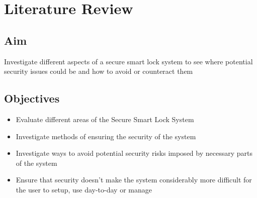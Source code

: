 \chapter{Literature Review}
\label{chap:literature_review}

\section{Aim}
Investigate different aspects of a secure smart lock system to see where potential security issues could be and how to avoid or counteract them
\section{Objectives}
\begin{itemize}
	\item {Evaluate different areas of the Secure Smart Lock System}
	\item Investigate methods of ensuring the security of the system
	\item Investigate ways to avoid potential security risks imposed by necessary parts of the system
	\item Ensure that security doesn't make the system considerably more difficult for the user to setup, use day-to-day or manage
\end{itemize}

